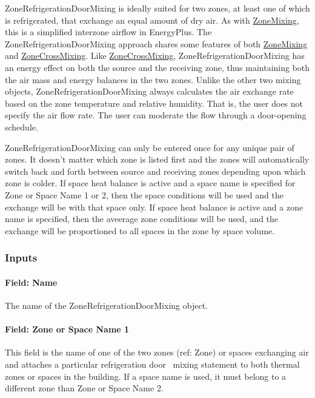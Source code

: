 ZoneRefrigerationDoorMixing is ideally suited for two zones, at least one of which is refrigerated, that exchange an equal amount of dry air. As with \hyperref[zonemixing]{ZoneMixing}, this is a simplified interzone airflow in EnergyPlus. The ZoneRefrigerationDoorMixing approach shares some features of both \hyperref[zonemixing]{ZoneMixing} and \hyperref[zonecrossmixing]{ZoneCrossMixing}. Like \hyperref[zonecrossmixing]{ZoneCrossMixing}, ZoneRefrigerationDoorMixing has an energy effect on both the source and the receiving zone, thus maintaining both the air mass and energy balances in the two zones. Unlike the other two mixing objects, ZoneRefrigerationDoorMixing always calculates the air exchange rate based on the zone temperature and relative humidity. That is, the user does not specify the air flow rate. The user can moderate the flow through a door-opening schedule.

ZoneRefrigerationDoorMixing can only be entered once for any unique pair of zones. It doesn't matter which zone is listed first and the zones will automatically switch back and forth between source and receiving zones depending upon which zone is colder. If space heat balance is active and a space name is specified for Zone or Space Name 1 or 2, then the space conditions will be used and the exchange will be with that space only. If space heat balance is active and a zone name is specified, then the aveerage zone conditions will be used, and the exchange will be proportioned to all spaces in the zone by space volume.

\subsubsection{Inputs}\label{inputs-7-003}

\paragraph{Field: Name}\label{field-name-7-002}

The name of the ZoneRefrigerationDoorMixing object.

\paragraph{Field: Zone or Space Name 1}\label{field-zone-1-name}

This field is the name of one of the two zones (ref: Zone) or spaces exchanging air and attaches a particular refrigeration door~ mixing statement to both thermal zones or spaces in the building. If a space name is used, it must belong to a different zone than Zone or Space Name 2.

